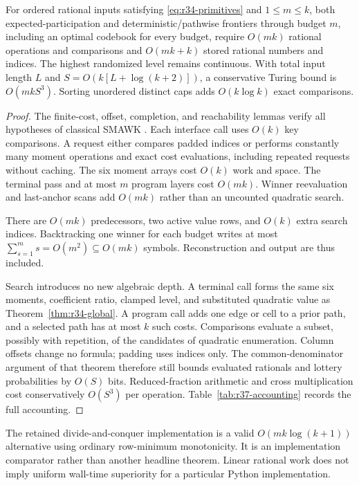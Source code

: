 \begin{theorem}\label{thm:r37-linear}
For ordered rational inputs satisfying \eqref{eq:r34-primitives} and $1\leq m\leq k$, both expected-participation and deterministic/pathwise frontiers through budget $m$, including an optimal codebook for every budget, require $O(mk)$ rational operations and comparisons and $O(mk+k)$ stored rational numbers and indices. The highest randomized level remains continuous. With total input length $L$ and $S=O(k[L+\log(k+2)])$, a conservative Turing bound is $O(mkS^3)$. Sorting unordered distinct caps adds $O(k\log k)$ exact comparisons.
\end{theorem}
\begin{proof}
The finite-cost, offset, completion, and reachability lemmas verify all hypotheses of classical SMAWK \citep{AggarwalEtAl1987}. Each interface call uses $O(k)$ key comparisons. A request either compares padded indices or performs constantly many moment operations and exact cost evaluations, including repeated requests without caching. The six moment arrays cost $O(k)$ work and space. The terminal pass and at most $m$ program layers cost $O(mk)$. Winner reevaluation and last-anchor scans add $O(mk)$ rather than an uncounted quadratic search.

There are $O(mk)$ predecessors, two active value rows, and $O(k)$ extra search indices. Backtracking one winner for each budget writes at most $\sum_{s=1}^m s=O(m^2)\subseteq O(mk)$ symbols. Reconstruction and output are thus included.

Search introduces no new algebraic depth. A terminal call forms the same six moments, coefficient ratio, clamped level, and substituted quadratic value as Theorem~\ref{thm:r34-global}. A program call adds one edge or cell to a prior path, and a selected path has at most $k$ such costs. Comparisons evaluate a subset, possibly with repetition, of the candidates of quadratic enumeration. Column offsets change no formula; padding uses indices only. The common-denominator argument of that theorem therefore still bounds evaluated rationals and lottery probabilities by $O(S)$ bits. Reduced-fraction arithmetic and cross multiplication cost conservatively $O(S^3)$ per operation. Table~\ref{tab:r37-accounting} records the full accounting.
\end{proof}

The retained divide-and-conquer implementation is a valid $O(mk\log(k+1))$ alternative using ordinary row-minimum monotonicity. It is an implementation comparator rather than another headline theorem. Linear rational work does not imply uniform wall-time superiority for a particular Python implementation.
